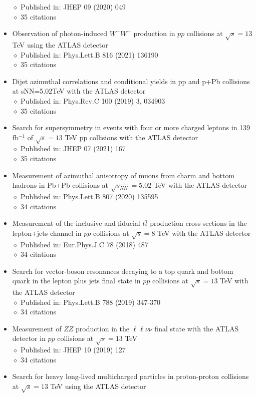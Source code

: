 \documentclass[margin, 10pt]{res} %
\begin{document}
\begin{resume}
\begin{itemize}
$\diamond$ Published in: JHEP 09 (2020) 049\\
$\diamond$ 35 citations
\item Observation of photon-induced $W^{+}W^{-}$ production in $pp$ collisions at $\sqrt{s} = 13$ TeV using the ATLAS detector\\
$\diamond$ Published in: Phys.Lett.B 816 (2021) 136190\\
$\diamond$ 35 citations
\item Dijet azimuthal correlations and conditional yields in pp and p+Pb collisions at sNN=5.02TeV with the ATLAS detector\\
$\diamond$ Published in: Phys.Rev.C 100 (2019) 3, 034903\\
$\diamond$ 35 citations
\item Search for supersymmetry in events with four or more charged leptons in 139 fb$^{-1}$ of $\sqrt{s} = 13$ TeV pp collisions with the ATLAS detector\\
$\diamond$ Published in: JHEP 07 (2021) 167\\
$\diamond$ 35 citations
\item Measurement of azimuthal anisotropy of muons from charm and bottom hadrons in Pb+Pb collisions at $\sqrt{s_{NN}} = 5.02$ TeV with the ATLAS detector\\
$\diamond$ Published in: Phys.Lett.B 807 (2020) 135595\\
$\diamond$ 34 citations
\item Measurement of the inclusive and fiducial $t\bar{t}$ production cross-sections in the lepton+jets channel in $pp$ collisions at $\sqrt{s} = 8$ TeV with the ATLAS detector\\
$\diamond$ Published in: Eur.Phys.J.C 78 (2018) 487\\
$\diamond$ 34 citations
\item Search for vector-boson resonances decaying to a top quark and bottom quark in the lepton plus jets final state in $pp$ collisions at $\sqrt{s} = 13$ TeV with the ATLAS detector\\
$\diamond$ Published in: Phys.Lett.B 788 (2019) 347-370\\
$\diamond$ 34 citations
\item Measurement of $ZZ$ production in the $\ell\ell\nu\nu$ final state with the ATLAS detector in $pp$ collisions at $\sqrt{s} = 13$ TeV\\
$\diamond$ Published in: JHEP 10 (2019) 127\\
$\diamond$ 34 citations
\item Search for heavy long-lived multicharged particles in proton-proton collisions at $\sqrt{s} = 13$ TeV using the ATLAS detector\\

\end{itemize}
\end{resume}
\end{document}
